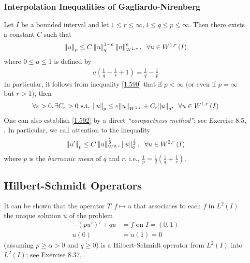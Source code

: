 \documentclass[a4paper,oneside]{article}
\numberwithin{equation}{section}
\begin{document}
\subsubsection{Interpolation Inequalities of Gagliardo-Nirenberg}
Let $I$ be a bounded interval and let $1\le r\le \infty,1\le q\le p\le \infty$. Then there exists a constant $C$ such that
\begin{align}
\label{1.590}
{\left\| u \right\|_p} \le C\left\| u \right\|_q^{1 - a}\left\| u \right\|_{{W^{1,r}}}^a,\hspace{0.2cm} \forall u \in {W^{1,r}}\left( I \right)
\end{align}
where $0\le a\le 1$ is defined by 
\begin{align}
a\left( {\frac{1}{q} - \frac{1}{r} + 1} \right) = \frac{1}{q} - \frac{1}{p}
\end{align}
In particular, it follows from inequality \eqref{1.590} that if $p<\infty$ (or even if $p=\infty$ but $r>1$), then
\begin{align}
\label{1.592}
\forall \varepsilon  > 0,\exists {C_\varepsilon } > 0\mbox{ s.t. } {\left\| u \right\|_p} \le \varepsilon {\left\| u \right\|_{{W^{1,r}}}} + {C_\varepsilon }{\left\| u \right\|_q},\hspace{0.2cm}\forall u \in {W^{1,r}}\left( I \right)
\end{align}
One can also establish \eqref{1.592} by a direct \textit{``compactness method''}; see Exercise 8.5, \cite{1}. In particular, we call attention to the inequality
\begin{align}
{\left\| {u'} \right\|_p} \le C\left\| u \right\|_{{W^{2,r}}}^{\frac{1}{2}}\left\| u \right\|_q^{\frac{1}{2}},\hspace{0.2cm}\forall u \in {W^{2,r}}\left( I \right)
\end{align}
where $p$ is the \textit{harmonic mean} of $q$ and $r$, i.e., $\frac{1}{p} = \frac{1}{2}\left( {\frac{1}{q} + \frac{1}{r}} \right)$.
\subsection{Hilbert-Schmidt Operators}
It can be shown that the operator $T:f\mapsto u$ that associates to each $f$ in $L^2\left(I\right)$ the unique solution $u$ of the problem
\begin{align}
 - \left( {pu'} \right)' + qu &= f\mbox{ on } I = \left( {0,1} \right)\\
u\left( 0 \right) &= u\left( 1 \right) = 0
\end{align}
(assuming $p\ge \alpha >0$ and $q\ge 0$) is a Hilbert-Schmidt operator from $L^2\left(I\right)$ into $L^2\left(I\right)$; see Exercise 8.37, \cite{1}.
\end{document}
